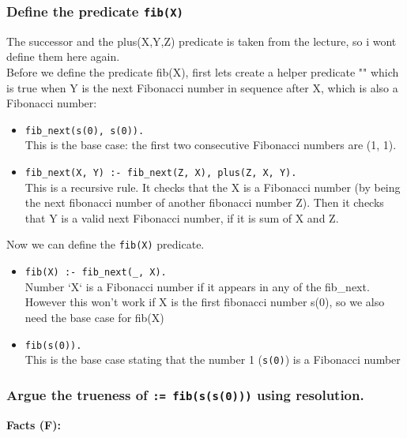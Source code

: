 \documentclass[10pt, a4paper]{article}
\begin{document}
\subsubsection{Define the predicate \texttt{fib(X)}}
The successor and the plus(X,Y,Z) predicate is taken from the lecture, so i wont define them here again.\\

Before we define the predicate fib(X), first lets create a helper predicate "" which is true when Y is the next Fibonacci number in sequence after X, which is also a Fibonacci number:\\

\begin{itemize}
\item \texttt{fib\_next(s(0), s(0)).} \\
    This is the base case: the first two consecutive Fibonacci numbers are (1, 1).
\item \texttt{fib\_next(X, Y) :- fib\_next(Z, X), plus(Z, X, Y).}  \\
    This is a recursive rule. It checks that the X is a Fibonacci number (by being the next fibonacci number of another fibonacci number Z). Then it checks that Y is a valid next Fibonacci number, if it is sum of X and Z.
\end{itemize}

Now we can define the \texttt{fib(X)} predicate.

\begin{itemize}
    \item \texttt{fib(X) :- fib\_next(\_, X).}\\
    Number `X` is a Fibonacci number if it appears in any of the fib\_next. However this won't work if X is the first fibonacci number s(0), so we also need the base case for fib(X)
    
    \item \texttt{fib(s(0)).} \\
    This is the base case stating that the number 1 (\texttt{s(0)}) is a Fibonacci number
    
\end{itemize}

\subsubsection{Argue the trueness of \texttt{:= fib(s(s(0)))} using resolution.}

\textbf{Facts (F):}\\
\end{document}
